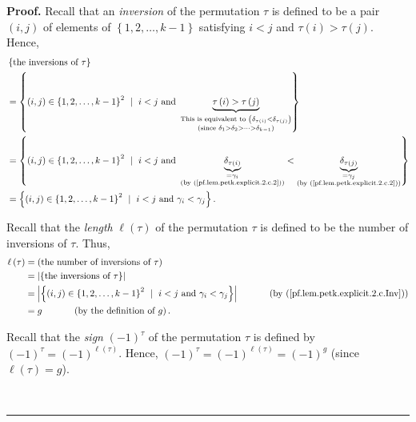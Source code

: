 \documentclass[numbers=enddot,12pt,final,onecolumn,notitlepage]{scrartcl}%
\theoremstyle{definition}
\newenvironment{proof}[1][Proof]{\noindent\textbf{#1.} }{\ \rule{0.5em}{0.5em}}
\begin{document}
\begin{proof}
Recall that an \emph{inversion} of the permutation $\tau$ is defined to be a
pair $\left(  i,j\right)  $ of elements of $\left\{  1,2,\ldots,k-1\right\}  $
satisfying $i<j$ and $\tau\left(  i\right)  >\tau\left(  j\right)  $. Hence,%
\begin{align}
&  \left\{  \text{the inversions of }\tau\right\} \nonumber\\
&  =\left\{  \left(  i,j\right)  \in\left\{  1,2,\ldots,k-1\right\}
^{2}\ \mid\ i<j\text{ and }\underbrace{\tau\left(  i\right)  >\tau\left(
j\right)  }_{\substack{\text{This is equivalent to }\left(  \delta
_{\tau\left(  i\right)  }<\delta_{\tau\left(  j\right)  }\right)
\\\text{(since }\delta_{1}>\delta_{2}>\cdots>\delta_{k-1}\text{)}}}\right\}
\nonumber\\
&  =\left\{  \left(  i,j\right)  \in\left\{  1,2,\ldots,k-1\right\}
^{2}\ \mid\ i<j\text{ and }\underbrace{\delta_{\tau\left(  i\right)  }%
}_{\substack{=\gamma_{i}\\\text{(by (\ref{pf.lem.petk.explicit.2.c.2}))}%
}}<\underbrace{\delta_{\tau\left(  j\right)  }}_{\substack{=\gamma
_{j}\\\text{(by (\ref{pf.lem.petk.explicit.2.c.2}))}}}\right\} \nonumber\\
&  =\left\{  \left(  i,j\right)  \in\left\{  1,2,\ldots,k-1\right\}
^{2}\ \mid\ i<j\text{ and }\gamma_{i}<\gamma_{j}\right\}  .
\label{pf.lem.petk.explicit.2.c.Inv}%
\end{align}


Recall that the \emph{length} $\ell\left(  \tau\right)  $ of the permutation
$\tau$ is defined to be the number of inversions of $\tau$. Thus,%
\begin{align*}
\ell\left(  \tau\right)   &  =\left(  \text{the number of inversions of }%
\tau\right) \\
&  =\left\vert \left\{  \text{the inversions of }\tau\right\}  \right\vert \\
&  =\left\vert \left\{  \left(  i,j\right)  \in\left\{  1,2,\ldots
,k-1\right\}  ^{2}\ \mid\ i<j\text{ and }\gamma_{i}<\gamma_{j}\right\}
\right\vert \ \ \ \ \ \ \ \ \ \ \left(  \text{by
(\ref{pf.lem.petk.explicit.2.c.Inv})}\right) \\
&  =g\ \ \ \ \ \ \ \ \ \ \left(  \text{by the definition of }g\right)  .
\end{align*}


Recall that the \emph{sign} $\left(  -1\right)  ^{\tau}$ of the permutation
$\tau$ is defined by $\left(  -1\right)  ^{\tau}=\left(  -1\right)
^{\ell\left(  \tau\right)  }$. Hence, $\left(  -1\right)  ^{\tau}=\left(
-1\right)  ^{\ell\left(  \tau\right)  }=\left(  -1\right)  ^{g}$ (since
$\ell\left(  \tau\right)  =g$).


\end{proof}
\end{document}
